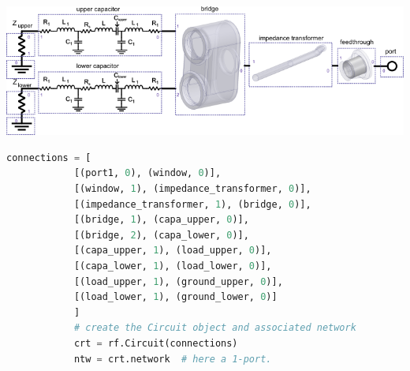 \documentclass{aip-cp}
\begin{document}
	\begin{minipage}{\textwidth}
		\begin{minipage}[b]{0.55\textwidth}
			\centering
			\includegraphics[width=\linewidth]{figures/antenna_circuit}
			
			\label{fig:antenna_circuit}
		\end{minipage}
		\hfill
		\begin{minipage}[b]{0.4\textwidth}
			\begin{lstlisting}[language=Python, basicstyle=\tiny]
			connections = [
			[(port1, 0), (window, 0)],
			[(window, 1), (impedance_transformer, 0)],
			[(impedance_transformer, 1), (bridge, 0)],
			[(bridge, 1), (capa_upper, 0)],
			[(bridge, 2), (capa_lower, 0)],
			[(capa_upper, 1), (load_upper, 0)],
			[(capa_lower, 1), (load_lower, 0)],
			[(load_upper, 1), (ground_upper, 0)],
			[(load_lower, 1), (ground_lower, 0)]
			]
			# create the Circuit object and associated network
			crt = rf.Circuit(connections) 
			ntw = crt.network  # here a 1-port.
			\end{lstlisting}
			\label{fig:skrf_circuit_halfantenna}
		\end{minipage}
	\end{minipage}
	
\end{document}
